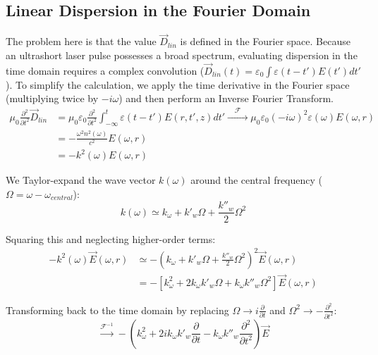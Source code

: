 \subsection*{Linear Dispersion in the Fourier Domain}
The problem here is that the value $\vec{D}_{lin}$ is defined in the Fourier space. Because an ultrashort laser pulse possesses a broad spectrum, evaluating dispersion in the time domain requires a complex convolution ($\vec{D}_{lin}(t) = \varepsilon_0 \int \varepsilon(t-t') E(t') dt'$). To simplify the calculation, we apply the time derivative in the Fourier space (multiplying twice by $-i\omega$) and then perform an Inverse Fourier Transform.
\begin{align}
\mu_0 \frac{\partial^2}{\partial t^2} \vec{D}_{lin} &= \mu_0 \varepsilon_0 \frac{\partial^2}{\partial t^2} \int_{-\infty}^{t} \varepsilon(t-t') E(r, t', z) dt' \xrightarrow{\quad \mathcal{F} \quad} \mu_0 \varepsilon_0 (-i\omega)^2 \varepsilon(\omega) E(\omega, r) \nonumber \\
&= -\frac{\omega^2 n^2(\omega)}{c^2} E(\omega, r) \nonumber \\
&= -k^2(\omega) E(\omega, r)
\end{align}

We Taylor-expand the wave vector $k(\omega)$ around the central frequency ($\Omega = \omega - \omega_{central}$):
\begin{equation*}
k(\omega) \simeq k_{\omega} + k'_w \Omega + \frac{k''_w}{2} \Omega^2
\end{equation*}

Squaring this and neglecting higher-order terms:
\begin{align}
-k^2(\omega) \vec{E}(\omega, r) &\simeq -\left( k_{\omega} + k'_w \Omega + \frac{k''_w}{2} \Omega^2 \right)^2 \vec{E}(\omega, r) \nonumber \\
&= -\left[ k_{\omega}^2 + 2 k_{\omega} k'_w \Omega + k_{\omega} k''_w \Omega^2 \right] \vec{E}(\omega, r)
\end{align}

Transforming back to the time domain by replacing $\Omega \rightarrow i \frac{\partial}{\partial t}$ and $\Omega^2 \rightarrow -\frac{\partial^2}{\partial t^2}$:
\begin{equation}
\xrightarrow{\mathcal{F}^{-1}} -\left(k_{\omega}^2 + 2 i k_{\omega} k'_w \frac{\partial }{\partial t} - k_{\omega} k''_w \frac{\partial^2 }{\partial t^2} \right) \vec{E}
\end{equation}

